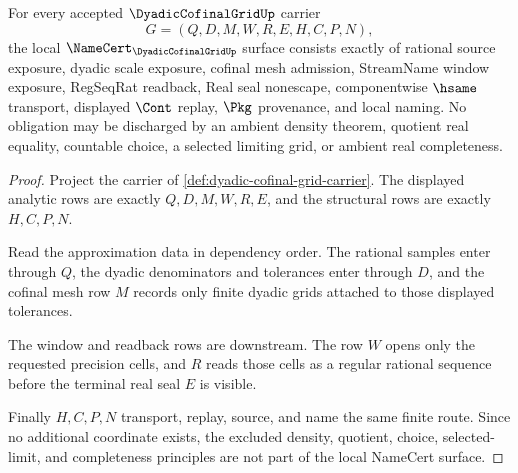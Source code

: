 \begin{theorem}
\label{thm:dyadic-cofinal-grid-namecert-obligations}
For every accepted $\DyadicCofinalGridUp$ carrier
$$
G=(Q,D,M,W,R,E,H,C,P,N),
$$
the local $\NameCert_{\DyadicCofinalGridUp}$ surface consists exactly of rational source exposure, dyadic scale exposure, cofinal mesh admission, StreamName window exposure, RegSeqRat readback, Real seal nonescape, componentwise $\hsame$ transport, displayed $\Cont$ replay, $\Pkg$ provenance, and local naming. No obligation may be discharged by an ambient density theorem, quotient real equality, countable choice, a selected limiting grid, or ambient real completeness.
\end{theorem}
\begin{proof}
Project the carrier of \autoref{def:dyadic-cofinal-grid-carrier}. The displayed analytic rows are exactly $Q,D,M,W,R,E$, and the structural rows are exactly $H,C,P,N$.

Read the approximation data in dependency order. The rational samples enter through $Q$, the dyadic denominators and tolerances enter through $D$, and the cofinal mesh row $M$ records only finite dyadic grids attached to those displayed tolerances.

The window and readback rows are downstream. The row $W$ opens only the requested precision cells, and $R$ reads those cells as a regular rational sequence before the terminal real seal $E$ is visible.

Finally $H,C,P,N$ transport, replay, source, and name the same finite route. Since no additional coordinate exists, the excluded density, quotient, choice, selected-limit, and completeness principles are not part of the local NameCert surface.
\end{proof}

